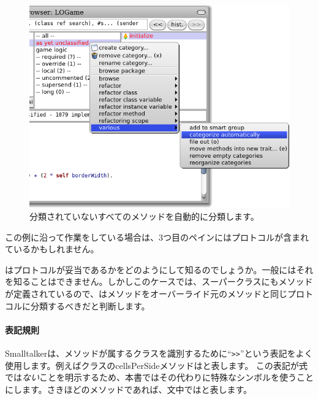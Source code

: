 \documentclass[a4paper,10pt,twoside]{book}
\begin{document}

\begin{figure}[htbp]
   \centering
   \includegraphics[width=\textwidth]{Categorize}
   \caption{分類されていないすべてのメソッドを自動的に分類します。}
\end{figure}

この例に沿って作業をしている場合は、3つ目のペインにはプロトコルが含まれているかもしれません。


\pharo はプロトコルが妥当であるかをどのようにして知るのでしょうか。一般に\pharo はそれを知ることはできません。しかしこのケースでは、スーパークラスにもメソッドが定義されているので、\pharo はメソッドをオーバーライド元のメソッドと同じプロトコルに分類するべきだと判断します。



\paragraph{表記規則} Smalltalkerは、メソッドが属するクラスを識別するために``\verb|>>|''という表記をよく使用します。例えばクラスのcellsPerSideメソッドはと表します。
この表記が\st 式では\emph{ない}ことを明示するため、本書ではその代わりに特殊なシンボル\ct{>>>}を使うことにします。さきほどのメソッドであれば、文中ではと表します。
\end{document}

